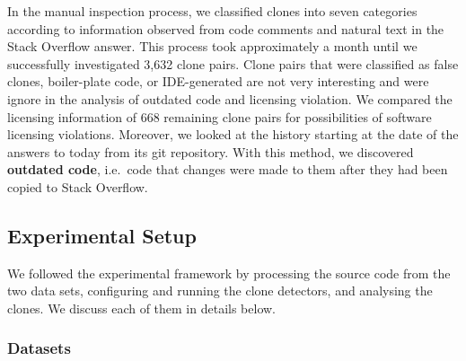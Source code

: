 \documentclass[sigconf,review, anonymous]{acmart}
\begin{document}
In the manual inspection process, we classified clones into seven categories according to information observed from code comments and natural text in the Stack Overflow answer. This process took approximately a month until we successfully investigated 3,632 clone pairs. Clone pairs that were classified as false clones, boiler-plate code, or IDE-generated are not very interesting and were ignore in the analysis of outdated code and licensing violation. 
We compared the licensing information of 668 remaining clone pairs for possibilities of software licensing violations. Moreover, we looked at the history starting at the date of the answers to today from its git repository. With this method, we discovered \textbf{outdated code}, i.e.~code that changes were made to them after they had been copied to Stack Overflow. %

\subsection{Experimental Setup}

We followed the experimental framework by processing the source code from the two data sets, configuring and running the clone detectors, and analysing the clones. We discuss each of them in details below. 

\subsubsection{Datasets}
\end{document}
